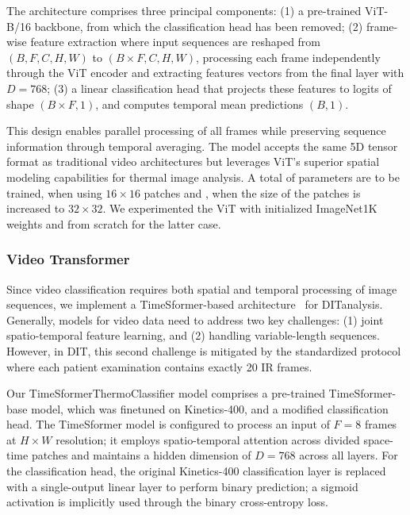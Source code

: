 \documentclass[runningheads]{llncs}
\begin{document}
The architecture comprises three principal components: (1) a
pre-trained ViT-B/16 backbone, from which the classification head has
been removed; (2) frame-wise feature extraction where input sequences
are reshaped from \((B, F, C, H, W)\) to \((B \times F, C, H, W)\),
processing each frame independently through the ViT encoder and
extracting features vectors from the final layer with \(D = 768\);
(3) a linear classification head that projects these features to
logits of shape \((B \times F, 1)\), and computes temporal mean
predictions \((B, 1)\). 

This design enables parallel processing of all frames while preserving
sequence information through temporal averaging. The model accepts the
same 5D tensor format as traditional video architectures but leverages
ViT's superior spatial modeling capabilities for thermal image
analysis. A total of  parameters are to be trained,
when using $16 \times 16$ patches and , when the
size of the patches is increased to $32\times 32$. We experimented the
\ac{ViT} with initialized ImageNet1K weights and from scratch for the
latter case.

\subsubsection{Video Transformer}
\label{sec:video-transformer}

Since video classification requires both spatial and temporal
processing of image sequences, we implement a TimeSformer-based
architecture~\cite{Bertasius2021} for \ac{DIT}analysis. Generally,
models for video data need to address two key challenges: (1) joint
spatio-temporal feature learning, and (2) handling variable-length
sequences. However, in \ac{DIT}, this second challenge is mitigated by
the standardized protocol where each patient examination contains
exactly 20 \ac{IR} frames.

Our TimeSformerThermoClassifier model comprises a pre-trained
TimeSformer-base model, which was finetuned on Kinetics-400, and a
modified classification head. The TimeSformer model is configured to
process an input of \( F = 8 \) frames at \( H \times W \) resolution;
it employs spatio-temporal attention across divided space-time patches
and maintains a hidden dimension of \( D = 768 \) across all
layers. For the classification head, the original Kinetics-400
classification layer is replaced with a single-output linear layer to
perform binary prediction; a sigmoid activation is implicitly used
through the binary cross-entropy loss.
\end{document}
